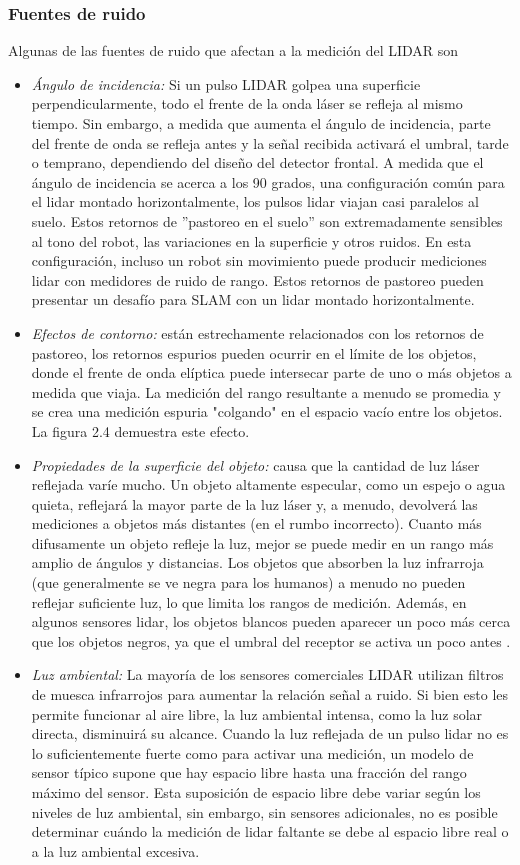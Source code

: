 \subsubsection{Fuentes de ruido}
Algunas de las fuentes de ruido que afectan a la medición del LIDAR son
\begin{itemize}
    \item \textit{Ángulo de incidencia:} Si un pulso LIDAR golpea una superficie perpendicularmente, todo el frente de la onda láser se refleja al mismo tiempo. Sin embargo, a medida que aumenta el ángulo de incidencia, parte del frente de onda se refleja antes y la señal recibida activará el umbral, tarde o temprano, dependiendo del diseño del detector frontal. A medida que el ángulo de incidencia se acerca a los 90 grados, una configuración común para el lidar montado horizontalmente, los pulsos lidar viajan casi paralelos al suelo. Estos retornos de ''pastoreo en el suelo'' son extremadamente sensibles al tono del robot, las variaciones en la superficie y otros ruidos. En esta configuración, incluso un robot sin movimiento puede producir mediciones lidar con medidores de ruido de rango. Estos retornos de pastoreo pueden presentar un desafío para SLAM con un lidar montado horizontalmente.
    \item \textit{Efectos de contorno:} están estrechamente relacionados con los retornos de pastoreo, los retornos espurios pueden ocurrir en el límite de los objetos, donde el frente de onda elíptica puede intersecar parte de uno o más objetos a medida que viaja. La medición del rango resultante a menudo se promedia y se crea una medición espuria "colgando" en el espacio vacío entre los objetos. La figura 2.4 demuestra este efecto.
    \item \textit{Propiedades de la superficie del objeto:} causa que la cantidad de luz láser reflejada varíe mucho. Un objeto altamente especular, como un espejo o agua quieta, reflejará la mayor parte de la luz láser y, a menudo, devolverá las mediciones a objetos más distantes (en el rumbo incorrecto). Cuanto más difusamente un objeto refleje la luz, mejor se puede medir en un rango más amplio de ángulos y distancias. Los objetos que absorben la luz infrarroja (que generalmente se ve negra para los humanos) a menudo no pueden reflejar suficiente luz, lo que limita los rangos de medición. Además, en algunos sensores lidar, los objetos blancos pueden aparecer un poco más cerca que los objetos negros, ya que el umbral del receptor se activa un poco antes \cite{pomerleau2012}.
    \item \textit{Luz ambiental:} La mayoría de los sensores comerciales LIDAR utilizan filtros de muesca infrarrojos para aumentar la relación señal a ruido. Si bien esto les permite funcionar al aire libre, la luz ambiental intensa, como la luz solar directa, disminuirá su alcance. Cuando la luz reflejada de un pulso lidar no es lo suficientemente fuerte como para activar una medición, un modelo de sensor típico supone que hay espacio libre hasta una fracción del rango máximo del sensor. Esta suposición de espacio libre debe variar según los niveles de luz ambiental, sin embargo, sin sensores adicionales, no es posible determinar cuándo la medición de lidar faltante se debe al espacio libre real o a la luz ambiental excesiva.

\end{itemize}
